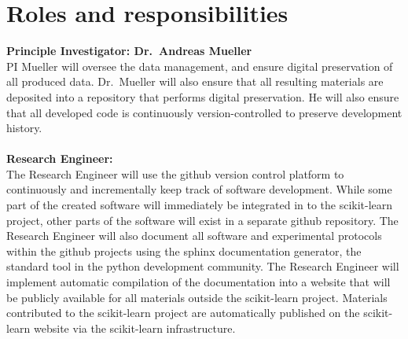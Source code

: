 











%

\section{Roles and responsibilities}

\textbf{Principle Investigator: Dr.\ Andreas Mueller}\\
PI Mueller will oversee the data management, and ensure digital preservation of
all produced data. Dr.\ Mueller will also ensure that all resulting materials
are deposited into a repository that performs digital preservation.
He will also ensure that all developed code is continuously version-controlled to
preserve development history.
\\\\
\textbf{Research Engineer:}\\
The Research Engineer will use the github version control platform to
continuously and incrementally keep track of software development. While some
part of the created software will immediately be integrated in to the
scikit-learn project, other parts of the software will exist in a separate
github repository. The Research Engineer will also document all software and
experimental protocols within the github projects using the sphinx
documentation generator, the standard tool in the python development community.
The Research Engineer will implement automatic compilation of the documentation
into a website that will be publicly available for all materials outside the scikit-learn
project. Materials contributed to the scikit-learn project are automatically
published on the scikit-learn website via the scikit-learn infrastructure.

